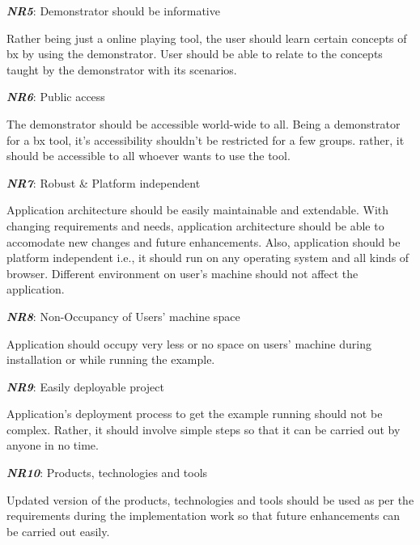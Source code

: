 \textbf{\textit{NR5}}: Demonstrator should be informative

Rather being just a online playing tool, the user should learn certain concepts of bx by using the demonstrator. User should be able to relate to the concepts taught by the demonstrator with its scenarios.

\textbf{\textit{NR6}}: Public access

The demonstrator should be accessible world-wide to all. Being a demonstrator for a bx tool, it's accessibility shouldn't be restricted for a few groups. rather, it should be accessible to all whoever wants to use the tool.

\textbf{\textit{NR7}}: Robust \& Platform independent

Application architecture should be easily maintainable and extendable. With changing requirements and needs, application architecture should be able to accomodate new changes and future enhancements. 
Also, application should be platform independent i.e., it should run on any operating system and all kinds of browser. Different environment on user's machine should not affect the application.

\textbf{\textit{NR8}}: Non-Occupancy of Users' machine space

Application should occupy very less or no space on users' machine during installation or while running the example. 
 
\textbf{\textit{NR9}}: Easily deployable project

Application's deployment process to get the example running should not be complex. Rather, it should involve simple steps so that it can be carried out by anyone in no time.

\textbf{\textit{NR10}}: Products, technologies and tools

Updated version of the products, technologies and tools should be used as per the requirements during the implementation work so that future enhancements can be carried out easily.
